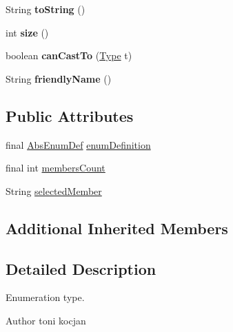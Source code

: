 \begin{DoxyCompactItemize}
\item 
\mbox{\label{classcompiler_1_1seman_1_1type_1_1_enum_type_a417c744f356cf9d7366171219189a393}} 
String {\bfseries to\+String} ()
\item 
\mbox{\label{classcompiler_1_1seman_1_1type_1_1_enum_type_ac11411421c08c7dbbfbe0cf50d744cb9}} 
int {\bfseries size} ()
\item 
\mbox{\label{classcompiler_1_1seman_1_1type_1_1_enum_type_a8ad19a12be93f42881849e1f7cf7244b}} 
boolean {\bfseries can\+Cast\+To} (\hyperlink{classcompiler_1_1seman_1_1type_1_1_type}{Type} t)
\item 
\mbox{\label{classcompiler_1_1seman_1_1type_1_1_enum_type_ada311dc1c90d293834c2f432eb996929}} 
String {\bfseries friendly\+Name} ()
\end{DoxyCompactItemize}
\subsection*{Public Attributes}
\begin{DoxyCompactItemize}
\item 
final \hyperlink{classcompiler_1_1abstr_1_1tree_1_1def_1_1_abs_enum_def}{Abs\+Enum\+Def} \hyperlink{classcompiler_1_1seman_1_1type_1_1_enum_type_ad64629e424833fae2ec20f48213fee90}{enum\+Definition}
\item 
final int \hyperlink{classcompiler_1_1seman_1_1type_1_1_enum_type_a3579edc052640352e070e33936e09138}{members\+Count}
\item 
String \hyperlink{classcompiler_1_1seman_1_1type_1_1_enum_type_aaf99c0618eb46bcfee4982085e9b4086}{selected\+Member}
\end{DoxyCompactItemize}
\subsection*{Additional Inherited Members}


\subsection{Detailed Description}
Enumeration type. \begin{DoxyAuthor}{Author}
toni kocjan 
\end{DoxyAuthor}


